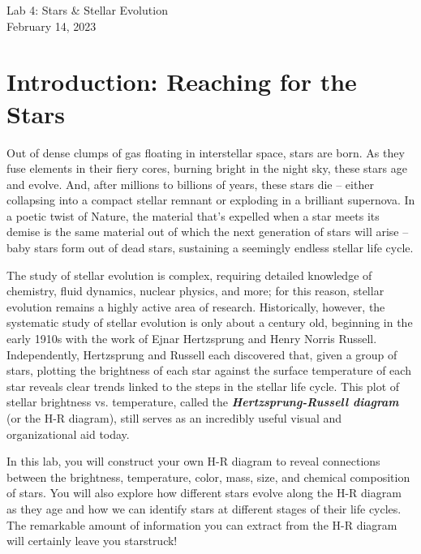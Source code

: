 \documentclass[11pt]{article}
\begin{document}
\begin{center}
\huge{Lab 4: Stars \& Stellar Evolution}\\ \medskip \Large{February 14, 2023}
\end{center}

\section{Introduction: Reaching for the Stars}

Out of dense clumps of gas floating in interstellar space, stars are born. As they fuse elements in their fiery cores, burning bright in the night sky, these stars age and evolve. And, after millions to billions of years, these stars die -- either collapsing into a compact stellar remnant or exploding in a brilliant supernova. In a poetic twist of Nature, the material that's expelled when a star meets its demise is the same material out of which the next generation of stars will arise -- baby stars form out of dead stars, sustaining a seemingly endless stellar life cycle.  

The study of stellar evolution is complex, requiring detailed knowledge of chemistry, fluid dynamics, nuclear physics, and more; for this reason, stellar evolution remains a highly active area of research. Historically, however, the systematic study of stellar evolution is only about a century old, beginning in the early 1910s with the work of Ejnar Hertzsprung and Henry Norris Russell. Independently, Hertzsprung and Russell each discovered that, given a group of stars, plotting the brightness of each star against the surface temperature of each star reveals clear trends linked to the steps in the stellar life cycle. This plot of stellar brightness vs. temperature, called the \textbf{\emph{Hertzsprung-Russell diagram}} (or the H-R diagram), still serves as an incredibly useful visual and organizational aid today.

In this lab, you will construct your own H-R diagram to reveal connections between the brightness, temperature, color, mass, size, and chemical composition of stars. You will also explore how different stars evolve along the H-R diagram as they age and how we can identify stars at different stages of their life cycles. The remarkable amount of information you can extract from the H-R diagram will certainly leave you starstruck!
\end{document}
